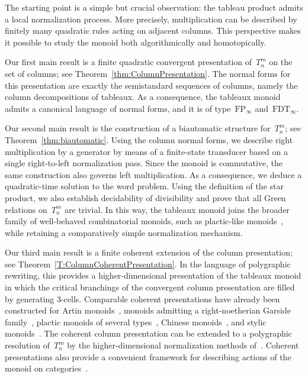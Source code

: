 \documentclass[a4paper, twoside, 11pt, english]{article}
\begin{document}
The starting point is a simple but crucial observation: the tableau product admits a local normalization process. More precisely, multiplication can be described by finitely many quadratic rules acting on adjacent columns. This perspective makes it possible to study the monoid both algorithmically and homotopically.

Our first main result is a finite quadratic convergent presentation of~$T_n^m$ on the set of columns; see Theorem~\ref{thm:ColumnPresentation}. The normal forms for this presentation are exactly the semistandard sequences of columns, namely the column decompositions of tableaux. As a consequence, the tableaux monoid admits a canonical language of normal forms, and it is of type~$\mathrm{FP}_\infty$ and~$\mathrm{FDT}_\infty$.

Our second main result is the construction of a biautomatic structure for~$T_n^m$; see Theorem~\ref{thm:biautomatic}. Using the column normal forms, we describe right multiplication by a generator by means of a finite-state transducer based on a single right-to-left normalization pass. Since the monoid is commutative, the same construction also governs left multiplication.  As a consequence, we deduce a quadratic-time solution to the word problem. Using the definition of the star product, we also establish decidability of divisibility and prove that all Green relations on~$T_n^m$ are trivial. In this way, the tableaux monoid joins the broader family of well-behaved combinatorial monoids, such as plactic-like monoids~\cite{CainGrayMalheiro15,CainGrayMalheiro19,CainGrayMalheiro15b}, while retaining a comparatively simple normalization mechanism.

Our third main result is a finite coherent extension of the column presentation; see Theorem~\ref{T:ColumnCoherentPresentation}. In the language of polygraphic rewriting, this provides a higher-dimensional presentation of the tableaux monoid in which the critical branchings of the convergent column presentation are filled by generating $3$-cells. Comparable coherent presentations have already been constructed for Artin monoids~\cite{GaussentGuiraudMalbos15}, monoids admitting a right-noetherian Garside family~\cite{CurienDuricGuiraud23}, plactic monoids of several types~\cite{HageMalbos17, Meha2021}, Chinese monoids~\cite{HageMalbos22}, and stylic monoids~\cite{hage2026coherent}. The coherent column presentation can be extended to a polygraphic resolution of~$T_n^m$ by the higher-dimensional
normalization methods of~\cite{GuiraudMalbos12advances}. Coherent presentations also provide a convenient framework for describing actions of the monoid on categories~\cite{GaussentGuiraudMalbos15}.
\end{document}
